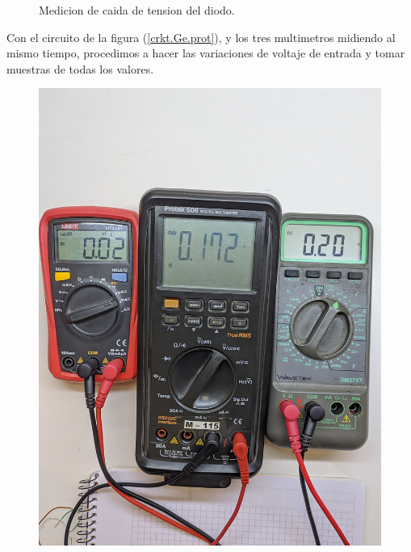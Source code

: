 \documentclass[chaptersright]{informeutn}
\begin{document}
\begin{figure}[H]
\begin{minipage}{0.3\textwidth}
          \caption{Medicion de caida de tension del diodo.}
          \label{crkt.Ge.mult.vd}
        \end{minipage}
      \end{figure}

      Con el circuito de la figura (\ref{crkt.Ge.prot}), y los tres multimetros midiendo al mismo tiempo, procedimos a
      hacer las variaciones de voltaje de entrada y tomar muestras de todas los valores.

      \begin{figure}[!ht]
        \centering
        \begin{minipage}{0.25\textwidth}
          \includegraphics[width=1\textwidth]{pictures/mult_crkt-2_03.jpg}
        \end{minipage}
        \begin{minipage}{0.25\textwidth}

\end{minipage}
\end{figure}
\end{document}
